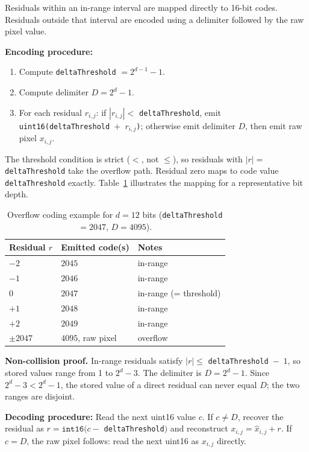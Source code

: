 \documentclass[journal]{IEEEtran}
\begin{document}
Residuals within an in-range interval are mapped directly to 16-bit codes.
Residuals outside that interval are encoded using a delimiter followed by the
raw pixel value.

\textbf{Encoding procedure:}
\begin{enumerate}
  \item Compute \texttt{deltaThreshold} $= 2^{d-1} - 1$.
  \item Compute delimiter $D = 2^d - 1$.
  \item For each residual $r_{i,j}$: if $|r_{i,j}| <$ \texttt{deltaThreshold},
  emit \texttt{uint16(deltaThreshold $+$ $r_{i,j}$)}; otherwise emit delimiter
  $D$, then emit raw pixel $x_{i,j}$.
\end{enumerate}

The threshold condition is strict ($<$, not $\leq$), so residuals with
$|r| =$ \texttt{deltaThreshold} take the overflow path. Residual zero maps
to code value \texttt{deltaThreshold} exactly. Table~\ref{tab:overflow-map}
illustrates the mapping for a representative bit depth.

\begin{table}[htbp]
\centering
\caption{Overflow coding example for $d=12$ bits
(\texttt{deltaThreshold}$=2047$, $D=4095$).}
\label{tab:overflow-map}
\scriptsize
\begin{tabular}{lll}
\toprule
Residual $r$ & Emitted code(s) & Notes \\
\midrule
$-2$ & $2045$ & in-range \\
$-1$ & $2046$ & in-range \\
$0$  & $2047$ & in-range (= threshold) \\
$+1$ & $2048$ & in-range \\
$+2$ & $2049$ & in-range \\
$\pm 2047$ & $4095$, raw pixel & overflow \\
\bottomrule
\end{tabular}
\end{table}

\textbf{Non-collision proof.} In-range residuals satisfy $|r| \leq$
\texttt{deltaThreshold}~$-$~$1$, so stored values range from 1 to $2^d - 3$.
The delimiter is $D = 2^d - 1$. Since $2^d - 3 < 2^d - 1$, the stored value of
a direct residual can never equal $D$; the two ranges are disjoint.

\textbf{Decoding procedure:} Read the next uint16 value $c$.
If $c \neq D$, recover the residual as $r = \texttt{int16}(c -$
\texttt{deltaThreshold}$)$ and reconstruct $x_{i,j} = \hat{x}_{i,j} + r$.
If $c = D$, the raw pixel follows: read the next uint16 as $x_{i,j}$ directly.
\end{document}
